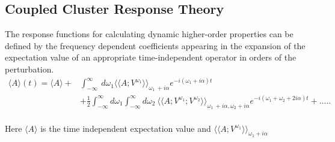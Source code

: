 
\subsection{Coupled Cluster Response Theory}
The response functions for calculating dynamic higher-order properties 
can be defined by the frequency dependent coefficients appearing in the 
expansion of the expectation value of an appropriate time-independent 
operator in orders of the perturbation.\cite{koch90}
\begin{equation}
\begin{split}
\langle A \rangle (t) = \langle A \rangle + & \int_{-\infty}^{\infty}\
d\omega_1{\langle\langle A;V^{\omega_1}\rangle\rangle}_{\omega_1  \
+ i\alpha}e^{-i(\omega_1 + i\alpha)t} \\
& + \frac{1}{2} \int_{-\infty}^{\infty}d\omega_1\int_{-\infty}^{\infty}d\omega_2\
{\langle\langle A;V^{\omega_1};V^{\omega_2}\rangle\rangle}_{\omega_1 \
+ i\alpha,\omega_2 + i\alpha}e^{-i(\omega_1 + \omega_2 + 2i\alpha)t} + .....
\end{split}
\end{equation}
\\
Here $\langle A \rangle$ is the time independent expectation value and
${\langle\langle A;V^{\omega_1}\rangle\rangle}_{\omega_1 + i\alpha}$
